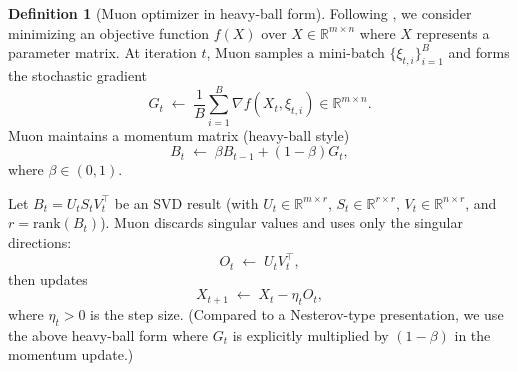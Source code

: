 \documentclass{article}
\theoremstyle{plain}
\theoremstyle{definition}
\newtheorem{definition}[theorem]{Definition}
\theoremstyle{remark}
\begin{document}
\begin{definition}[Muon optimizer in heavy-ball form]
\label{def:muon}
Following \citet{li2025muon}, we consider minimizing an objective function $f(X)$ over $X\in\mathbb{R}^{m\times n}$ where $X$ represents a parameter matrix.
At iteration $t$, Muon samples a mini-batch $\{\xi_{t,i}\}_{i=1}^B$ and forms the stochastic gradient
\begin{equation}
G_t \;\gets\; \frac{1}{B}\sum_{i=1}^B \nabla f(X_t,\xi_{t,i}) \in \mathbb{R}^{m\times n}.
\end{equation}
Muon maintains a momentum matrix (heavy-ball style)
\begin{equation}
B_t \;\gets\; \beta B_{t-1} + (1-\beta)G_t,
\end{equation}
where $\beta\in(0,1)$.

Let $B_t = U_t S_t V_t^\top$ be an SVD result (with $U_t\in\mathbb{R}^{m\times r}$, $S_t\in\mathbb{R}^{r\times r}$, $V_t\in\mathbb{R}^{n\times r}$, and $r=\mathrm{rank}(B_t)$).
Muon discards singular values and uses only the singular directions:
\begin{equation}
O_t \;\gets\; U_t V_t^\top,
\end{equation}
then updates
\begin{equation}
X_{t+1} \;\gets\; X_t - \eta_t O_t,
\end{equation}
where $\eta_t>0$ is the step size.
(Compared to a Nesterov-type presentation, we use the above heavy-ball form where $G_t$ is explicitly multiplied by $(1-\beta)$ in the momentum update.)
\end{definition}
\end{document}
